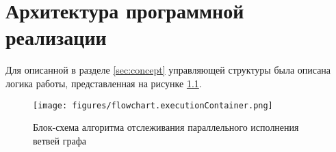 \chapter{Архитектура программной реализации}\label{chap3_soft_architecture}

Для описанной в разделе \ref{sec:concept} управляющей структуры была описана логика работы, представленная на рисунке \ref{fig:flowchartExecutionContainer}.
\begin{figure}[!ht]
    \centering
    \texttt{[image: figures/flowchart.executionContainer.png]}
    \caption{Блок-схема алгоритма отслеживания параллельного исполнения ветвей графа}
    \label{fig:flowchartExecutionContainer}
\end{figure}

